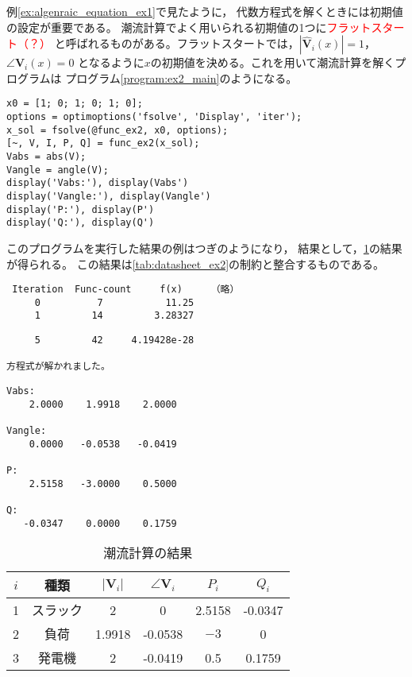 {\begin{例}[潮流計算の解き方]
例\nobreak\ref{ex:algenraic_equation_ex1}で見たように，
代数方程式を解くときには初期値の設定が重要である。
潮流計算でよく用いられる初期値の1つに\textcolor{red}{フラットスタート（？）}
と呼ばれるものがある。フラットスタートでは，$|\hat{\bm V}_i(x)|=1$，$\angle \bm V_i(x) = 0$
となるように$x$の初期値を決める。これを用いて潮流計算を解くプログラムは
プログラム\nobreak\ref{program:ex2_main}のようになる。
\begin{PROGRAMA}[count,title={main\_ex2.m}]\label{program:ex2_main}
\begin{verbatim}
x0 = [1; 0; 1; 0; 1; 0];
options = optimoptions('fsolve', 'Display', 'iter');
x_sol = fsolve(@func_ex2, x0, options);
[~, V, I, P, Q] = func_ex2(x_sol);
Vabs = abs(V);
Vangle = angle(V);
display('Vabs:'), display(Vabs')
display('Vangle:'), display(Vangle')
display('P:'), display(P')
display('Q:'), display(Q')
\end{verbatim}
\end{PROGRAMA}

このプログラムを実行した結果の例はつぎのようになり，
結果として，\ref{tab:result_ex2}の結果が得られる。
この結果は\ref{tab:datasheet_ex2}の制約と整合するものである。

\begin{実行結果}
\begin{verbatim}
 Iteration  Func-count     f(x)     （略）
     0          7           11.25 
     1         14         3.28327 
\end{verbatim}
\omitcode
\begin{verbatim}
     5         42     4.19428e-28

方程式が解かれました。
\end{verbatim}
\omitcode
\begin{verbatim}
Vabs:
    2.0000    1.9918    2.0000

Vangle:
    0.0000   -0.0538   -0.0419

P:
    2.5158   -3.0000    0.5000

Q:
   -0.0347    0.0000    0.1759
\end{verbatim}
\end{実行結果}
\begin{table}
\centering
\caption{潮流計算の結果}\label{tab:result_ex2}
 \begin{tabular}{cccccc}
   $i$ & 種類 & $|\bm V_i|$ & $\angle \bm V_i$ & $P_i$ & $Q_i$\\\hline\hline
   1 & スラック & 2 & 0 & 2.5158 & -0.0347\\
   2 & 負荷 & 1.9918 & -0.0538 & $-3$ & 0 \\
   3 & 発電機 & 2 & -0.0419 & 0.5  & 0.1759\\
\hline
 \end{tabular}
\end{table}
\end{例}

}
